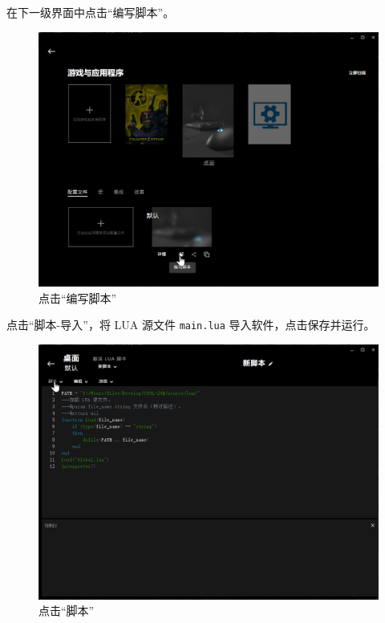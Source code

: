 在下一级界面中点击“编写脚本”。

\begin{figure}[H]
    \Centering
    \includegraphics[width=\textwidth]{docs/assets/script.png}
    \caption{点击“编写脚本”}
\end{figure}

点击“脚本-导入”，将 LUA 源文件 \lstinline{main.lua} 导入软件，点击保存并运行。

\begin{figure}[H]
    \Centering
    \includegraphics[width=\textwidth]{docs/assets/edit.png}
    \caption{点击“脚本”}
\end{figure}

